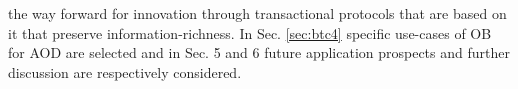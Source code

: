 \documentclass[final,5p,times,twocolumn,authoryear]{elsarticle}
\begin{document}
the way forward for innovation through transactional protocols that are based on it that preserve information-richness.  In Sec. \ref{sec:btc4} specific use-cases of OB for AOD are selected and in Sec. 5 and 6 future application prospects and further discussion are respectively considered.



\end{document}
